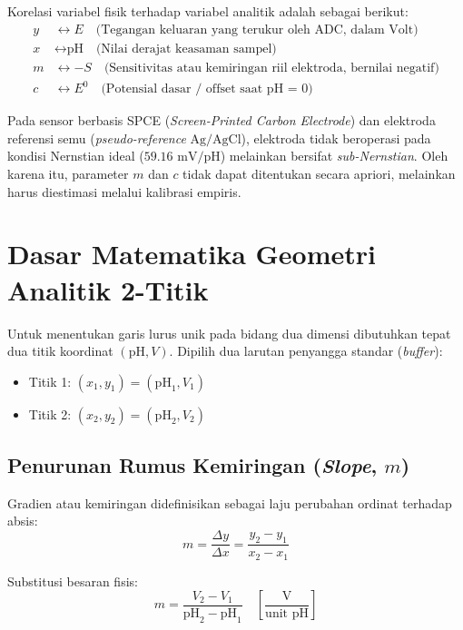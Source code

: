 \documentclass[12pt,a4paper]{article}
\begin{document}
\noindent Korelasi variabel fisik terhadap variabel analitik adalah sebagai berikut:
\begin{align*}
y &\longleftrightarrow E \quad \text{(Tegangan keluaran yang terukur oleh ADC, dalam Volt)} \\
x &\longleftrightarrow \text{pH} \quad \text{(Nilai derajat keasaman sampel)} \\
m &\longleftrightarrow -S \quad \text{(Sensitivitas atau kemiringan riil elektroda, bernilai negatif)} \\
c &\longleftrightarrow E^0 \quad \text{(Potensial dasar / offset saat pH = 0)}
\end{align*}

Pada sensor berbasis SPCE (\textit{Screen-Printed Carbon Electrode}) dan elektroda referensi semu (\textit{pseudo-reference} $\text{Ag/AgCl}$), elektroda tidak beroperasi pada kondisi Nernstian ideal ($59.16\text{ mV/pH}$) melainkan bersifat \textit{sub-Nernstian}. Oleh karena itu, parameter $m$ dan $c$ tidak dapat ditentukan secara apriori, melainkan harus diestimasi melalui kalibrasi empiris.

\section{Dasar Matematika Geometri Analitik 2-Titik}

Untuk menentukan garis lurus unik pada bidang dua dimensi dibutuhkan tepat dua titik koordinat $(\text{pH}, V)$. Dipilih dua larutan penyangga standar (\textit{buffer}):
\begin{itemize}
    \item Titik 1: $(x_1, y_1) = (\text{pH}_1, V_1)$
    \item Titik 2: $(x_2, y_2) = (\text{pH}_2, V_2)$
\end{itemize}

\subsection{Penurunan Rumus Kemiringan (\textit{Slope}, $m$)}

Gradien atau kemiringan didefinisikan sebagai laju perubahan ordinat terhadap absis:
\begin{equation}
m = \frac{\Delta y}{\Delta x} = \frac{y_2 - y_1}{x_2 - x_1}
\end{equation}

Substitusi besaran fisis:
\begin{equation}
\label{eq:slope_formula}
m = \frac{V_2 - V_1}{\text{pH}_2 - \text{pH}_1} \quad \left[\frac{\text{V}}{\text{unit pH}}\right]
\end{equation}
\end{document}
